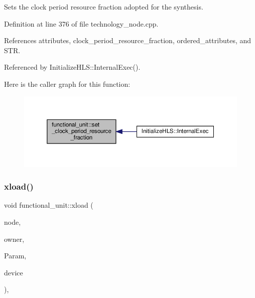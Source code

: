 Sets the clock period resource fraction adopted for the synthesis. 



Definition at line 376 of file technology\+\_\+node.\+cpp.



References attributes, clock\+\_\+period\+\_\+resource\+\_\+fraction, ordered\+\_\+attributes, and S\+TR.



Referenced by Initialize\+H\+L\+S\+::\+Internal\+Exec().

Here is the caller graph for this function\+:
\nopagebreak
\begin{figure}[H]
\begin{center}
\leavevmode
\includegraphics[width=350pt]{d8/dd6/structfunctional__unit_af2184fccfe63e8b0d8b9768d242f5558_icgraph}
\end{center}
\end{figure}
\mbox{\label{structfunctional__unit_ae93d5279bbc04feec0a49a79734d9a28}} 
\subsubsection{\texorpdfstring{xload()}{xload()}}
{\footnotesize\ttfamily void functional\+\_\+unit\+::xload (\begin{DoxyParamCaption}\item[{const \hyperlink{classxml__element}{xml\+\_\+element} $\ast$}]{node,  }\item[{const \hyperlink{technology__node_8hpp_a33dd193b7bd6b987bf0d8a770a819fa7}{technology\+\_\+node\+Ref}}]{owner,  }\item[{const \hyperlink{Parameter_8hpp_a37841774a6fcb479b597fdf8955eb4ea}{Parameter\+Const\+Ref}}]{Param,  }\item[{const \hyperlink{target__device_8hpp_acedb2b7a617e27e6354a8049fee44eda}{target\+\_\+device\+Ref}}]{device }\end{DoxyParamCaption})\hspace{0.3cm}{\ttfamily [override]}, {\ttfamily [virtual]}}



